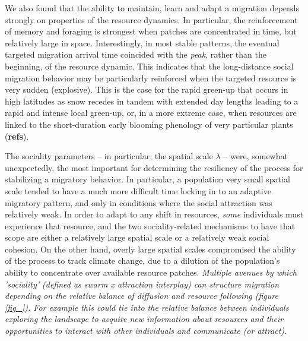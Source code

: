 \documentclass[utf8]{frontiersSCNS} %
\begin{document}
We also found that the ability to maintain, learn and adapt a migration depends strongly on properties of the resource dynamics. In particular, the reinforcement of memory and foraging is strongest when patches are concentrated in time, but relatively large in space. Interestingly, in most stable patterns, the eventual targeted migration arrival time coincided with the \emph{peak}, rather than the beginning, of the resource dynamic. This indicates that the long-distance social migration behavior may be particularly reinforced when the targeted resource is very sudden (explosive). This is the case for the rapid green-up that occurs in high latitudes as snow recedes in tandem with extended day lengths leading to a rapid and intense local green-up, or, in a more extreme case, when resources are linked to the short-duration early blooming phenology of very particular plants (\textbf{refs}). 

The sociality parameters -- in particular, the spatial scale $\lambda$ -- were, somewhat unexpectedly, the most important for determining the resiliency of the process for stabilizing a migratory behavior. In particular, a population very small spatial scale tended to have a much more difficult time locking in to an adaptive migratory pattern, and only in conditions where the social attraction was relatively weak. In order to adapt to any shift in resources, \emph{some} individuals must experience that resource, and the two sociality-related mechanisms to have that scope are either a relatively large spatial scale or a relatively weak social cohesion. On the other hand, overly large spatial scales compromised the ability of the process to track climate change, due to a dilution of the population's ability to concentrate over available resource patches. \emph{Multiple avenues by which 'sociality' (defined as swarm x attraction interplay) can structure migration depending on the relative balance of diffusion and resource following (figure \ref{fig_}).   For example this could tie into the relative balance between individuals exploring the landscape to acquire new information about resources and their opportunities to interact with other individuals and communicate (or attract).}
\end{document}
